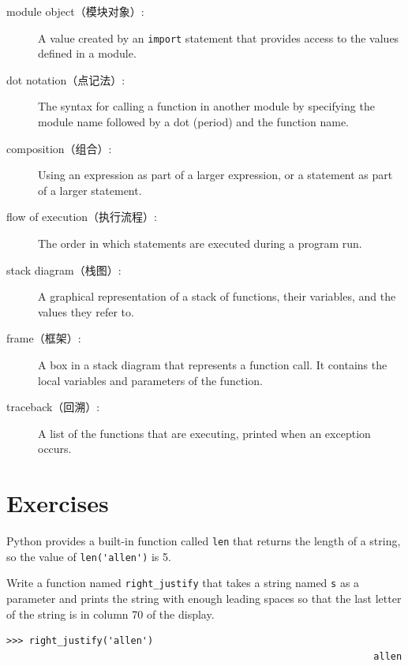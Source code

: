 \documentclass[10pt]{book}
\begin{document}
\begin{CJK}{UTF8}{gbsn}
\begin{description}
\item[module object（模块对象）:] A value created by an {\tt import} statement
that provides access to the values defined in a module.

\item[dot notation（点记法）:]  The syntax for calling a function in another
module by specifying the module name followed by a dot (period) and
the function name.

\item[composition（组合）:] Using an expression as part of a larger expression,
or a statement as part of a larger statement.

\item[flow of execution（执行流程）:]  The order in which statements are executed during
a program run.

\item[stack diagram（栈图）:]  A graphical representation of a stack of functions,
their variables, and the values they refer to.

\item[frame（框架）:]  A box in a stack diagram that represents a function call.
It contains the local variables and parameters of the function.

\item[traceback（回溯）:]  A list of the functions that are executing,
printed when an exception occurs.


\end{description}


\section{Exercises}

\begin{exercise}

Python provides a built-in function called {\tt len} that
returns the length of a string, so the value of \verb"len('allen')" is 5.

Write a function named \verb"right_justify" that takes a string
named {\tt s} as a parameter and prints the string with enough
leading spaces so that the last letter of the string is in column 70
of the display.

\begin{verbatim}
>>> right_justify('allen')
                                                                 allen
\end{verbatim}


\end{exercise}
\end{CJK}
\end{document}

